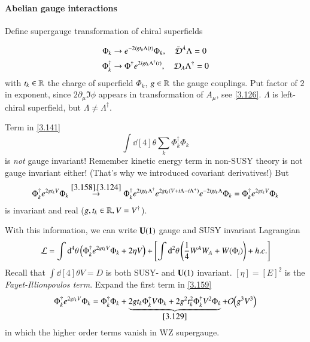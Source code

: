\paragraph{Abelian gauge interactions}
Define supergauge transformation of chiral superfields

\begin{subequations}
\label{3.158}
\begin{align}
   \Phi_k &\rightarrow e^{-2i g t_k \Lambda(t)} \Phi_k, \quad \bar{\mathcal{D}}^{\dot{A}}\Lambda = 0 \label{3.158a} \\
   \Phi_k^\dagger &\rightarrow \Phi^\dagger e^{2i g t_k \Lambda^\dagger(t)}, \quad \mathcal{D}_A\Lambda^\dagger = 0 \label{3.158b}
\end{align}
\end{subequations}
with $t_k \in \mathbb{R}$ the charge of superfield $\Phi_k$, $g \in \mathbb{R}$ the gauge couplings. Put factor of $2$ in exponent, since $2\partial_\mu \Im \phi$ appears in transformation of $A_\mu$, see \eqref{3.126}. $\Lambda$ is left-chiral superfield, but $\Lambda \neq \Lambda^\dagger$.

Term in \eqref{3.141}
\begin{equation*}
   \int \dd[4]{\theta} \sum_k \Phi^\dagger_k \Phi_k 
\end{equation*}
is \textit{not} gauge invariant! Remember kinetic energy term in non-SUSY theory is not gauge invariant either! (That's why we introduced covariant derivatives!) But 
\begin{equation*}
   \Phi^\dagger_k e^{2gt_k V} \Phi_k \stackrel{\eqref{3.158}, \eqref{3.124}}{\rightarrow} \Phi^\dagger_k e^{2igt_k \Lambda^\dagger} e^{2gt_k(V + i\Lambda - i \Lambda^+)} e^{-2igt_k \Lambda} \Phi_k =  \Phi^\dagger_k e^{2gt_k V} \Phi_k 
\end{equation*}
is invariant and real ($g, t_k \in \mathbb{R}, V=V^\dagger$).

With this information, we can write $\mathbf{U}(1)$ gauge and SUSY invariant Lagrangian
\begin{equation}
   \mathcal{L} = \int \dd[4]{\theta} \left( \Phi_k^\dagger e^{2gt_k V} \Phi_k + 2\eta V \right) + \left[ \int \dd[2]{\theta} \left( \frac{1}{4} W^A W_A + W(\Phi_i) \right) +h.c. \right] \label{3.159} 
\end{equation}
Recall that $\int \dd[4]{\theta} V = D$ is both SUSY- and $\mathbf{U}(1)$ invariant. $[\eta] = [E]^2$ is the \textit{Fayet-Illionpoulos term}. Expand the first term in \eqref{3.159} 
\begin{equation*}
   \Phi_k^\dagger e^{2gt_k V} \Phi_k = \Phi_k^\dagger \Phi_k + \underbrace{2gt_k \Phi_k^\dagger V \Phi_k + 2 g^2t_k^2 \Phi^\dagger_k V^2 \Phi_k}_{\eqref{3.129}} + \order{g^3 V^3}
\end{equation*}
in which the higher order terms vanish in WZ supergauge.

